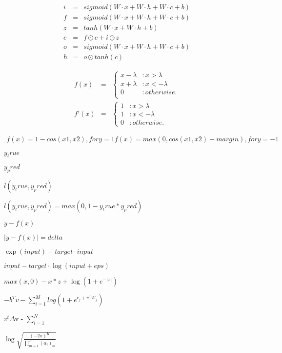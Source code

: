 \documentclass{article}
\begin{document}
\begin{eqnarray} i &=& sigmoid(W \cdot x + W \cdot h + W \cdot c + b) \\ f &=& sigmoid(W \cdot x + W \cdot h + W \cdot c + b) \\ z &=& tanh(W \cdot x + W \cdot h + b) \\ c &=& f \odot c + i \odot z \\ o &=& sigmoid(W \cdot x + W \cdot h + W \cdot c + b) \\ h &=& o \odot tanh(c) \end{eqnarray}
\pagebreak

\begin{eqnarray*} f(x) &=& \begin{cases} x - \lambda & : x > \lambda \\ x + \lambda & : x < -\lambda \\ 0 & : otherwise. \\ \end{cases} \\ f'(x) &=& \begin{cases} 1 & : x > \lambda \\ 1 & : x < -\lambda \\ 0 & : otherwise. \end{cases} \end{eqnarray*}
\pagebreak

\begin{eqnarray*} f(x) = 1 - cos(x1, x2) , for y = 1 f(x) = max(0, cos(x1, x2) - margin) , for y = -1 \end{eqnarray*}
\pagebreak

$y_true$
\pagebreak

$y_pred$
\pagebreak

$l(y_true, y_pred)$
\pagebreak

$l(y_true, y_pred) = max(0, 1 - y_true*y_pred)$
\pagebreak

$ y - f(x) $
\pagebreak

$ |y - f(x)| = delta $
\pagebreak

$ \exp(input) - target \cdot input $
\pagebreak

$ input - target \cdot \log(input + eps) $
\pagebreak

$max(x, 0) - x * z + \log(1 + e^{-|x|})$
\pagebreak

$ -b^Tv - \sum_{i=1}^M log(1 + e^{c_j+v^TW_j}) $
\pagebreak

$ v^t$$\Delta$v - $\sum_{i=1}^N $
\pagebreak

$ \log{ \sqrt{\frac{(-2\pi)^K}{\prod_{m=1}^{K}(\alpha_i)_m}}} $
\pagebreak
\end{document}
